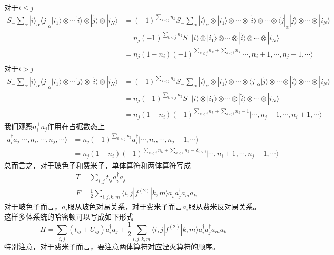 \documentclass[12pt]{article}
\begin{document}
对于$i\leq j$
\begin{equation*}
    \begin{split}
        S_-\sum_\alpha|i\rangle_\alpha\langle j|_\alpha|i_1\rangle\otimes\cdots|\tilde{i}\rangle\otimes|\tilde{j}\rangle\otimes|i_N\rangle&=(-1)^{\sum_{k<j}n_k}S_-\sum_\alpha|i\rangle_\alpha\otimes|i_1\rangle\otimes\cdots\otimes|\tilde{i}\rangle\otimes\cdots\otimes\langle j|_\alpha|\tilde{j}\rangle\otimes\cdots\otimes|i_N\rangle\\
        &=n_j(-1)^{\sum_{k\leq j}n_k}S_-|i\rangle\otimes|i_1\rangle\otimes\cdots\otimes|\tilde{i}\rangle\otimes\cdots\otimes|i_N\rangle\\
        &=n_j(1-n_i)(-1)^{\sum_{k\leq j}n_k+\sum_{k<i}n_k}|\cdots,n_i+1,\cdots,n_j-1,\cdots\rangle\\
    \end{split}
\end{equation*}
对于$i>j$
\begin{equation*}
    \begin{split}
        S_-\sum_\alpha|i\rangle_\alpha\langle j|_\alpha|i_1\rangle\otimes\cdots|\tilde{j}\rangle\otimes|\tilde{i}\rangle\otimes|i_N\rangle&=(-1)^{\sum_{k<j}n_k}S_-\sum_\alpha|i\rangle_\alpha\otimes|i_1\rangle\otimes\cdots\otimes\langle j|_\alpha|\tilde{j}\rangle\otimes\cdots\otimes|\tilde{i}\rangle\otimes\cdots\otimes|i_N\rangle\\
        &=n_j(-1)^{\sum_{k<j}n_k}S_-|i\rangle\otimes|i_1\rangle\otimes\cdots\otimes|\tilde{i}\rangle\otimes\cdots\otimes|i_N\rangle\\
        &=n_j(1-n_i)(-1)^{\sum_{k<j}n_k+\sum_{k<i}n_k-1}|\cdots,n_j-1,\cdots,n_i+1,\cdots\rangle
    \end{split}
\end{equation*}
我们观察$a_i^+a_j$作用在占据数态上
\begin{equation*}
    \begin{split}
        a_i^\dagger a_j|\cdots,n_i,\cdots,n_j,\cdots\rangle&=n_j(-1)^{\sum_{k<j}n_k}a_i^\dagger|\cdots,n_i,\cdots,n_j-1,\cdots\rangle\\
        &=n_j(1-n_i)(-1)^{\sum_{k<j}n_k+\sum_{k<i}n_k-\delta_{i>j}}|\cdots,n_i+1,\cdots,n_j-1,\cdots\rangle
    \end{split}
\end{equation*}
总而言之，对于玻色子和费米子，单体算符和两体算符写成
\begin{equation*}
    \begin{split}
        &T=\sum_{i,j}t_{ij}a_i^\dagger a_j\\
        &F=\frac{1}{2}\sum_{i,j,k,m}\langle i,j|f^{(2)}|k,m\rangle a_i^\dagger a_j^\dagger a_m a_k
    \end{split}
\end{equation*}
对于玻色子而言，$a_i$服从玻色对易关系，对于费米子而言$a_i$服从费米反对易关系。这样多体系统的哈密顿可以写成如下形式
\begin{equation*}
    H=\sum_{i,j}(t_{ij}+U_{ij})a_i^\dagger a_j+\frac{1}{2}\sum_{i,j,k,m}\langle i,j|f^{(2)}|k,m\rangle a_i^\dagger a_j^\dagger a_m a_k
\end{equation*}
特别注意，对于费米子而言，要注意两体算符对应湮灭算符的顺序。
\end{document}
